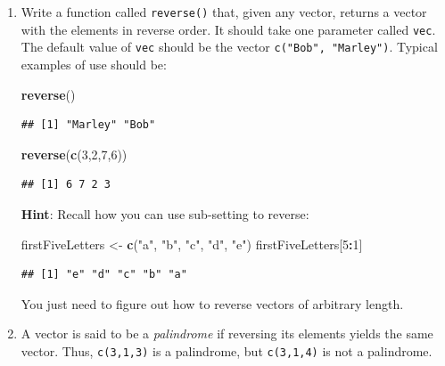 \documentclass[]{book}
\makeatletter
\newenvironment{Shaded}{\begin{snugshade}}{\end{snugshade}}
\newcommand{\KeywordTok}[1]{\textcolor[rgb]{0.13,0.29,0.53}{\textbf{#1}}}
\newcommand{\DecValTok}[1]{\textcolor[rgb]{0.00,0.00,0.81}{#1}}
\newcommand{\StringTok}[1]{\textcolor[rgb]{0.31,0.60,0.02}{#1}}
\newcommand{\OperatorTok}[1]{\textcolor[rgb]{0.81,0.36,0.00}{\textbf{#1}}}
\newcommand{\NormalTok}[1]{#1}
\newenvironment{kframe}{%
\medskip{}
\setlength{\fboxsep}{.8em}
 \def\at@end@of@kframe{}%
 \ifinner\ifhmode%
  \def\at@end@of@kframe{\end{minipage}}%
  \begin{minipage}{\columnwidth}%
 \fi\fi%
 \def\FrameCommand##1{\hskip\@totalleftmargin \hskip-\fboxsep
 \colorbox{shadecolor}{##1}\hskip-\fboxsep
     \hskip-\linewidth \hskip-\@totalleftmargin \hskip\columnwidth}%
 \MakeFramed {\advance\hsize-\width
   \@totalleftmargin\z@ \linewidth\hsize
   \@setminipage}}%
 {\par\unskip\endMakeFramed%
 \at@end@of@kframe}
\renewenvironment{Shaded}{\begin{kframe}}{\end{kframe}}
\theoremstyle{definition}
\theoremstyle{definition}
\theoremstyle{definition}
\theoremstyle{remark}
\makeatother
\begin{document}
{\begin{enumerate}
\begin{verbatim}
## x
## xx
## xxx
## xx
## x
\end{verbatim}
\item
  Write a function called \texttt{reverse()} that, given any vector,
  returns a vector with the elements in reverse order. It should take
  one parameter called \texttt{vec}. The default value of \texttt{vec}
  should be the vector \texttt{c("Bob",\ "Marley")}. Typical examples of
  use should be:

\begin{Shaded}
\begin{Highlighting}[]
\KeywordTok{reverse}\NormalTok{()}
\end{Highlighting}
\end{Shaded}

\begin{verbatim}
## [1] "Marley" "Bob"
\end{verbatim}

\begin{Shaded}
\begin{Highlighting}[]
\KeywordTok{reverse}\NormalTok{(}\KeywordTok{c}\NormalTok{(}\DecValTok{3}\NormalTok{,}\DecValTok{2}\NormalTok{,}\DecValTok{7}\NormalTok{,}\DecValTok{6}\NormalTok{))}
\end{Highlighting}
\end{Shaded}

\begin{verbatim}
## [1] 6 7 2 3
\end{verbatim}

  \textbf{Hint}: Recall how you can use sub-setting to reverse:

\begin{Shaded}
\begin{Highlighting}[]
\NormalTok{firstFiveLetters <-}\StringTok{ }\KeywordTok{c}\NormalTok{(}\StringTok{"a"}\NormalTok{, }\StringTok{"b"}\NormalTok{, }\StringTok{"c"}\NormalTok{, }\StringTok{"d"}\NormalTok{, }\StringTok{"e"}\NormalTok{)}
\NormalTok{firstFiveLetters[}\DecValTok{5}\OperatorTok{:}\DecValTok{1}\NormalTok{]}
\end{Highlighting}
\end{Shaded}

\begin{verbatim}
## [1] "e" "d" "c" "b" "a"
\end{verbatim}

  You just need to figure out how to reverse vectors of arbitrary
  length.
\item
  A vector is said to be a \emph{palindrome} if reversing its elements
  yields the same vector. Thus, \texttt{c(3,1,3)} is a palindrome, but
  \texttt{c(3,1,4)} is not a palindrome.


\end{enumerate}}
\end{document}
